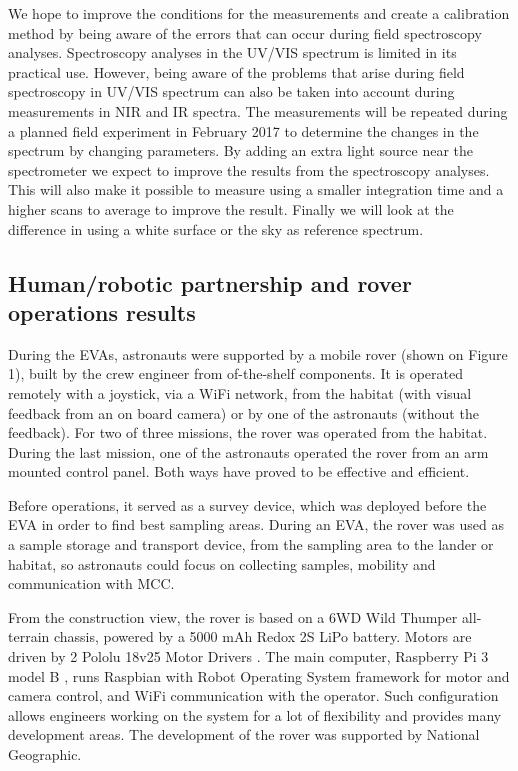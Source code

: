 \documentclass[preprint]{elsarticle}
\begin{document}
We hope to improve the conditions for the measurements and create a calibration method by being aware of the errors that can occur during field spectroscopy analyses. Spectroscopy analyses in the UV/VIS spectrum is limited in its practical use. However, being aware of the problems that arise during field spectroscopy in UV/VIS spectrum can also be taken into account during measurements in NIR and IR spectra. The measurements will be repeated during a planned field experiment in February 2017 to determine the changes in the spectrum by changing parameters. By adding an extra light source near the spectrometer we expect to improve the results from the spectroscopy analyses. This will also make it possible to measure using a smaller integration time and a higher scans to average to improve the result. Finally we will look at the difference in using a white surface or the sky as reference spectrum.

\subsection{Human/robotic partnership and rover operations results}
During the EVAs, astronauts were supported by a mobile rover (shown on Figure 1), built by the crew engineer from of-the-shelf components. It is operated remotely with a joystick, via a WiFi network, from the habitat (with visual feedback from an on board camera) or by one of the astronauts (without the feedback). For two of three missions, the rover was operated from the habitat. During the last mission, one of the astronauts operated the rover from an arm mounted control panel. Both ways have proved to be effective and efficient.

Before operations, it served as a survey device, which was deployed before the EVA in order to find best sampling areas. During an EVA, the rover was used as a sample storage and transport device, from the sampling area to the lander or habitat, so astronauts could focus on collecting samples, mobility and communication with MCC.

From the construction view, the rover is based on a 6WD Wild Thumper \cite{ref27} all-terrain chassis, powered by a 5000 mAh Redox 2S LiPo battery. Motors are driven by 2 Pololu 18v25 Motor Drivers \cite{ref26}. The main computer, Raspberry Pi 3 model B \cite{ref25}, runs Raspbian with Robot Operating System framework \cite{ref24} for motor and camera control, and WiFi communication with the operator. Such configuration allows engineers working on the system for a lot of flexibility and provides many development areas. The development of the rover was supported by National Geographic.
\end{document}
